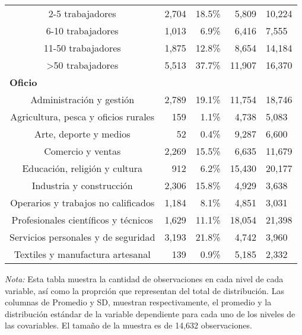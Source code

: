 \begin{longtable}{crrrl}
2-5 trabajadores & 2,704 & 18.5\% &  5,809 & 10,224 \\ 
6-10 trabajadores & 1,013 &  6.9\% &  6,416 &  7,555 \\ 
11-50 trabajadores & 1,875 & 12.8\% &  8,654 & 14,184 \\ 
>50 trabajadores & 5,513 & 37.7\% & 11,907 & 16,370 \\ 
\multicolumn{5}{l}{{\bfseries Oficio}} \\[2.5pt] 
Administración y gestión & 2,789 & 19.1\% & 11,754 & 18,746 \\ 
Agricultura, pesca y oficios rurales &   159 &  1.1\% &  4,738 &  5,083 \\ 
Arte, deporte y medios &    52 &  0.4\% &  9,287 &  6,600 \\ 
Comercio y ventas & 2,269 & 15.5\% &  6,635 & 11,679 \\ 
Educación, religión y cultura &   912 &  6.2\% & 15,430 & 20,177 \\ 
Industria y construcción & 2,306 & 15.8\% &  4,929 &  3,638 \\ 
Operarios y trabajos no calificados & 1,184 &  8.1\% &  4,851 &  3,031 \\ 
Profesionales científicos y técnicos & 1,629 & 11.1\% & 18,054 & 21,398 \\ 
Servicios personales y de seguridad & 3,193 & 21.8\% &  4,742 &  3,960 \\ 
Textiles y manufactura artesanal &   139 &  0.9\% &  5,185 &  2,332 \\ 
\bottomrule
\end{longtable}
\endgroup
\begin{minipage}{0.8\textwidth}
                                   \begin{tablenotes}
                                   \item \footnotesize \textit{Nota:} Esta tabla muestra la cantidad de observaciones en cada nivel de cada variable, 
                                   así como la proprción que representan del total de distribución.
                                   Las columnas de Promedio y SD, muestran respectivamente, el promedio y la distribución estándar
                                   de la variable dependiente para cada uno de los niveles de las covariables. 
                                   El tamaño de la muestra es de 14,632 observaciones.
                                   \end{tablenotes}
                                   \end{minipage}
